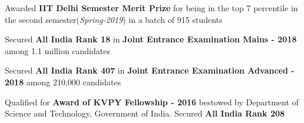 
\begin{cventries}
    \cventry{}{}{}{}
    {
        \vspace{-5.0mm}
        \begin{cvitems}
            \item{Awarded \textbf{IIT Delhi Semester Merit Prize} for being in the top 7 percentile in the second semester(\textit{Spring-2019}) in a batch of 915 students}
            \vspace{5pt}
            \item{Secured \textbf{All India Rank 18} in \textbf{Joint Entrance Examination Mains - 2018} among 1.1 million candidates}
            \vspace{5pt}
            \item{Secured \textbf{All India Rank 407} in \textbf{Joint Entrance Examination Advanced - 2018} among 210,000 candidates}
            \vspace{5pt}
            \item{Qualified for \textbf{Award of KVPY Fellowship - 2016} bestowed by Department of Science and Technology,
    Government of India. Secured \textbf{All India Rank 208} }
            \vspace{5pt}
        \end{cvitems}
    }
\end{cventries}